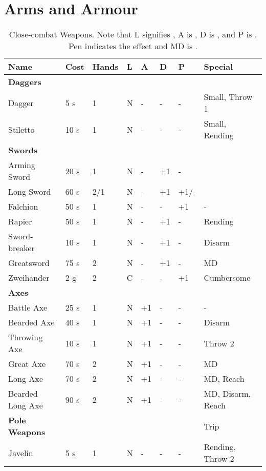 \chapter{Arms and Armour}
\label{chap:arms}

\begin{table}[ht!]
	\centering
	\caption{Close-combat Weapons. Note that L signifies , A is , D is , and P is . Pen indicates the  effect and MD is .}
	\label{tab:weps}
	\begin{tabular}{|l|l|l|l|l|l|l|l|}
		\hline
		Name & Cost & Hands & L & A & D & P & Special\\ [0.5ex]
		\hline 
		\textbf{Daggers} & & & & & & & \\
		\hline
		Dagger & 5 s & 1 & N & - & - & - & Small, Throw 1\\
		Stiletto & 10 s & 1 & N & - & - & - & Small, Rending \\
		\hline 
		\textbf{Swords} & & & & & & & \\
		\hline
		Arming Sword & 20 s & 1 & N & - & +1 & - & \\
		Long Sword & 60 s & 2/1 & N & - & +1 & +1/- & \\
		Falchion & 50 s & 1 & N & - & - & +1 & - \\ 
		Rapier & 50 s & 1 & N & - & +1 & - & Rending \\ 
		Sword-breaker & 10 s & 1 & N & - & +1 & - & Disarm\\
		Greatsword & 75 s & 2 & N & - & +1 & - & MD\\
		Zweihander & 2 g & 2 & C & - & - & +1 & Cumbersome\\ 
		\hline 
		\textbf{Axes} & & & & & & & \\
		\hline
		Battle Axe & 25 s & 1 & N & +1 & - & - & - \\
		Bearded Axe & 40 s & 1 & N & +1 & - & - & Disarm \\
		Throwing Axe & 10 s & 1 & N & +1 & - & - & Throw 2 \\
		Great Axe & 70 s & 2 & N & +1 & - & - & MD \\
		Long Axe & 70 s & 2 & N & +1 & - & - & MD, Reach \\
		Bearded Long Axe & 90 s & 2 & N & +1 & - & - & MD, Disarm, Reach \\
		\hline
		\textbf{Pole Weapons} & & & & & & & Trip \\
		\hline
		Javelin & 5 s & 1 & N & - & - & - & Rending, Throw 2\\

\end{tabular}
\end{table}
